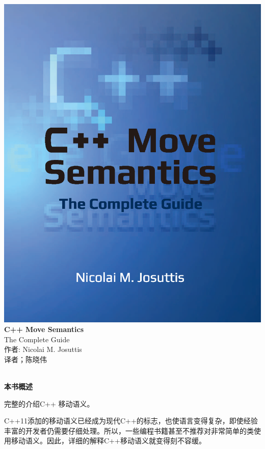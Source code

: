 \documentclass[11pt,a4paper,UTF8]{ctexart}
\begin{document}
	
	\begin{center}
		\includegraphics[width=1.\textwidth]{cover}
		\newpage
		\huge
		\textbf{C++ Move Semantics} 
		\\[9pt]
		\normalsize
		The Complete Guide
		\\[10pt]
		\normalsize 
		作者: Nicolai M. Josuttis
		\\[8pt]
		\normalsize
		译者；陈晓伟
	\end{center}
	
	\hspace*{\fill} \\ %
	\noindent\textbf{本书概述}\ \par

	完整的介绍C++ 移动语义。\par
	
	C++11添加的移动语义已经成为现代C++的标志，也使语言变得复杂，即使经验丰富的开发者仍需要仔细处理。所以，一些编程书籍甚至不推荐对非常简单的类使用移动语义。因此，详细的解释C++移动语义就变得刻不容缓。\par
	
\end{document}
